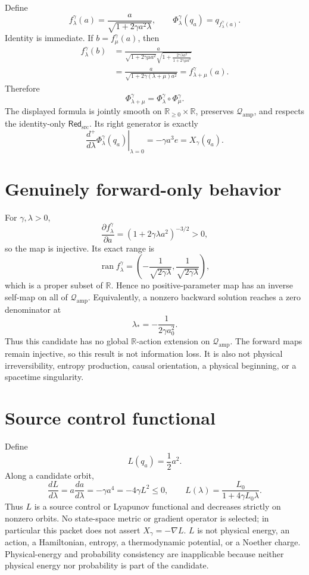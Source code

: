 \documentclass[11pt]{article}
\newcommand{\Qamp}{\mathcal Q_{\mathrm{amp}}}
\newcommand{\Red}{\mathsf{Red}_{\mathrm{src}}}
\begin{document}
Define
\[
 f^\gamma_\lambda(a)
 =\frac{a}{\sqrt{1+2\gamma a^2\lambda}},
 \qquad
 \Phi^\gamma_\lambda(q_a)=q_{f^\gamma_\lambda(a)} .
\]
Identity is immediate.  If \(b=f^\gamma_\mu(a)\), then
\[
 \begin{aligned}
 f^\gamma_\lambda(b)
 &=
 \frac{a}{
   \sqrt{1+2\gamma\mu a^2}
   \sqrt{1+\frac{2\gamma\lambda a^2}
                  {1+2\gamma\mu a^2}}}\\
 &=
 \frac{a}{\sqrt{1+2\gamma(\lambda+\mu)a^2}}
 =f^\gamma_{\lambda+\mu}(a).
 \end{aligned}
\]
Therefore
\[
 \Phi^\gamma_{\lambda+\mu}
 =
 \Phi^\gamma_\lambda\circ\Phi^\gamma_\mu .
\]
The displayed formula is jointly smooth on
\(\mathbb R_{\geq0}\times\mathbb R\), preserves \(\Qamp\), and respects the
identity-only \(\Red\).  Its right generator is exactly
\[
 \left.\frac{d^+}{d\lambda}
 \Phi^\gamma_\lambda(q_a)\right|_{\lambda=0}
 =-\gamma a^3e=X_\gamma(q_a).
\]

\section{Genuinely forward-only behavior}

For \(\gamma,\lambda>0\),
\[
 \frac{\partial f^\gamma_\lambda}{\partial a}
 =
 (1+2\gamma\lambda a^2)^{-3/2}>0,
\]
so the map is injective.  Its exact range is
\[
 \operatorname{ran}f^\gamma_\lambda
 =
 \left(
 -\frac1{\sqrt{2\gamma\lambda}},
  \frac1{\sqrt{2\gamma\lambda}}
 \right),
\]
which is a proper subset of \(\mathbb R\).  Hence no positive-parameter map
has an inverse self-map on all of \(\Qamp\).  Equivalently, a nonzero backward
solution reaches a zero denominator at
\[
 \lambda_*=-\frac1{2\gamma a_0^2}.
\]
Thus this candidate has no global \(\mathbb R\)-action extension on
\(\Qamp\).  The forward maps remain injective, so this result is not
information loss.  It is also not physical irreversibility, entropy
production, causal orientation, a physical beginning, or a spacetime
singularity.

\section{Source control functional}

Define
\[
 L(q_a)=\frac12a^2 .
\]
Along a candidate orbit,
\[
 \frac{dL}{d\lambda}
 =a\frac{da}{d\lambda}
 =-\gamma a^4
 =-4\gamma L^2\leq0,
\qquad
 L(\lambda)=\frac{L_0}{1+4\gamma L_0\lambda}.
\]
Thus \(L\) is a source control or Lyapunov functional and decreases strictly
on nonzero orbits.  No state-space metric or gradient operator is selected;
in particular this packet does not assert \(X_\gamma=-\nabla L\).
\(L\) is not physical energy, an action, a Hamiltonian, entropy, a
thermodynamic potential, or a Noether charge.  Physical-energy and probability
consistency are inapplicable because neither physical energy nor probability
is part of the candidate.
\end{document}
